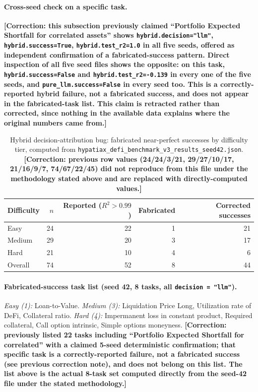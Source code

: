 \documentclass[twoside,11pt]{article}
\newcommand{\Rsq}{R^{2}}
\begin{document}
\paragraph{Cross-seed check on a specific task.}
\textbf{[Correction: this subsection previously claimed ``Portfolio
Expected Shortfall for correlated assets'' shows
\texttt{hybrid.decision="llm"}, \texttt{hybrid.success=True},
\texttt{hybrid.test\_r2=1.0} in all five seeds, offered as
independent confirmation of a fabricated-success pattern. Direct
inspection of all five seed files shows the opposite: on this task,
\texttt{hybrid.success=False} and \texttt{hybrid.test\_r2=-0.139} in
every one of the five seeds, and \texttt{pure\_llm.success=False} in
every seed too. This is a correctly-reported hybrid failure, not a
fabricated success, and does not appear in the fabricated-task list.
This claim is retracted rather than corrected, since nothing in the
available data explains where the original numbers came from.]}

\begin{table}[h]
\centering
\caption{Hybrid decision-attribution bug: fabricated near-perfect successes by
difficulty tier, computed from \texttt{hypatiax\_defi\_benchmark\_v3\_results\_seed42.json}.
\textbf{[Correction: previous row values (24/24/3/21, 29/27/10/17, 21/16/9/7,
74/67/22/45) did not reproduce from this file under the methodology stated
above and are replaced with directly-computed values.]}}
\label{tab:hybrid-bug-breakdown}
\begin{tabular}{lrrrr}
\toprule
Difficulty & $n$ & Reported ($\Rsq>0.99$) & Fabricated & Corrected successes \\
\midrule
Easy    & 24 & 22 & 1 & 21 \\
Medium  & 29 & 20 & 3 & 17 \\
Hard    & 21 & 10 & 4 & 6 \\
\midrule
Overall & 74 & 52 & 8 & 44 \\
\bottomrule
\end{tabular}
\end{table}

\paragraph{Fabricated-success task list (seed 42, 8 tasks, all
\texttt{decision = "llm"}).} \emph{Easy (1):} Loan-to-Value.
\emph{Medium (3):} Liquidation Price Long, Utilization rate of DeFi,
Collateral ratio. \emph{Hard (4):} Impermanent loss in constant
product, Required collateral, Call option intrinsic, Simple options
moneyness.
\textbf{[Correction: previously listed 22 tasks including
``Portfolio Expected Shortfall for correlated'' with a claimed 5-seed
deterministic confirmation; that specific task is a correctly-reported
failure, not a fabricated success (see previous correction note), and
does not belong on this list. The list above is the actual 8-task set
computed directly from the seed-42 file under the stated methodology.]}
\end{document}
